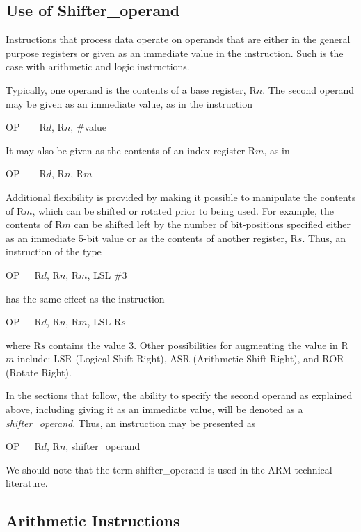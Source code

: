 \documentclass[11pt, twoside, pdftex]{article}
\begin{document}
\subsection{Use of Shifter\_operand}

Instructions that process data operate on operands that are
either in the general purpose registers or given as an immediate
value in the instruction. Such is the case with arithmetic and
logic instructions.

Typically, one operand is the contents of a base register,
R$n$. The second operand may be given as an immediate value,
as in the instruction
\begin{center}
OP~~~~R$d$, R$n$, \#value
\end{center}
\noindent
It may also be given as the contents of an index register R$m$,
as in
\begin{center}
OP~~~~R$d$, R$n$, R$m$
\end{center}
\noindent
Additional flexibility is provided by making it possible
to manipulate the contents of R$m$, which can be shifted or
rotated prior to being used. For example, the contents of R$m$
can be shifted left by the number of bit-positions specified
either as an immediate 5-bit value or as the contents of
another register, R$s$. Thus, an instruction of the type
\begin{center}
OP~~~R$d$, R$n$, R$m$, LSL \#3
\end{center}
\noindent
has the same effect as the instruction
\begin{center}
OP~~~R$d$, R$n$, R$m$, LSL R$s$
\end{center}
\noindent
where R$s$ contains the value 3. Other possibilities for
augmenting the value in R$m$ include: LSR (Logical Shift Right),
ASR (Arithmetic Shift Right), and ROR (Rotate Right).

In the sections that follow, the ability to specify the second
operand as explained above, including giving it as an immediate
value, will be denoted as a {\it shifter\_operand}. Thus, an
instruction may be presented as
\begin{center}
OP~~~R$d$, R$n$, shifter\_operand
\end{center}
\noindent
We should note that the term shifter\_operand is used
in the ARM technical literature.
  

\subsection{Arithmetic Instructions}
\end{document}
